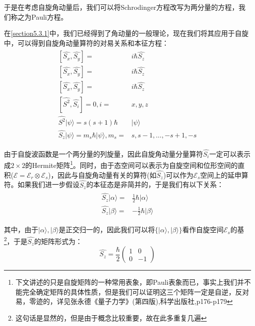         于是在考虑自旋角动量后，我们可以将Schrodinger方程改写为两分量的方程，我们称之为Pauli方程。
        
        
        在\ref{section5.3.1}中，我们已经得到了角动量的一般理论，现在我们将其应用于自旋中，可以得到自旋角动量算符的对易关系和本征方程：
        \begin{align}
            \begin{split}
             [\hat{S_x},\hat{S_y}]=&i\hbar\hat{S_z}\\
             [\hat{S_x},\hat{S_y}]=&i\hbar\hat{S_z}\\
             [\hat{S_x},\hat{S_y}]=&i\hbar\hat{S_z}\\
            [\hat{S^2},\hat{S_i}]=0,i=&x,y,z\\
            \hat{S^2}|\psi\rangle=s(s+1)\hbar&|\psi\rangle\\
            \hat{S_z}|\psi\rangle=m_s\hbar|\psi\rangle,m_s=&s,s-1,\ldots,-s+1,-s
            \end{split}
        \end{align}
        
       由于自旋波函数是一个两分量的列旋量，因此自旋角动量分量算符$\hat{S_i}$一定可以表示成$2\times 2$的Hermite矩阵\footnote{下文讲述的只是自旋矩阵的一种常用表象，即Pauli表象而已，事实上我们并不能完全确定矩阵的具体性质，但是我们可以证明这三个矩阵一定是自逆，反对易，零迹的，详见张永德《量子力学》(第四版),科学出版社,p176-p179}。同时，由于态空间可以表示为自旋空间和位形空间的直积($\mathcal{E}=\mathcal{E}_r\otimes\mathcal{E}_s$)，因此与自旋角动量有关的算符(如$\hat{S_z}$)可以作为$\mathcal{E}_s$空间上的延申算符。如果我们进一步假设$\hat{S_z}$的本征态是非简并的，于是我们有以下关系：
        \begin{align}
            \begin{split}
                \hat{S_z}|\alpha\rangle=&\frac{1}{2}\hbar|\alpha \rangle\\
                \hat{S_z}|\beta \rangle=&-\frac{1}{2}\hbar|\beta \rangle
            \end{split}
        \end{align}
        
        其中，由于$|\alpha \rangle,|\beta \rangle$是正交归一的，因此我们可以将$\{|\alpha \rangle,|\beta \rangle \}$看作自旋空间$\mathcal{E}_s$的基\footnote{这句话是显然的，但是由于概念比较重要，故在此多重复几遍}，于是$\hat{S_z}$的矩阵形式为：
        \begin{equation}
        \hat{S_z}=\frac{\hbar}{2}
            \begin{pmatrix}
            1 & 0\\
            0 & -1
            \end{pmatrix}
        \end{equation}
    

